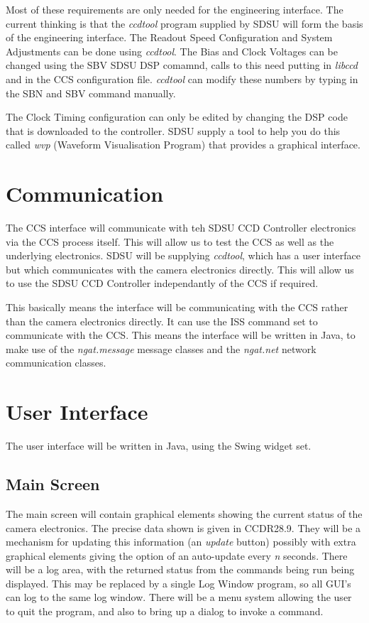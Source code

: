 \documentclass[10pt,a4paper]{article}
\begin{document}
Most of these requirements are only needed for the engineering interface. The current thinking is that the
{\em ccdtool} program supplied by SDSU will form the basis of the engineering interface. The 
Readout Speed Configuration and System Adjustments can be done using {\em ccdtool}. The Bias and Clock Voltages
can be changed using the SBV SDSU DSP comamnd, calls to this need putting in {\em libccd} and in the CCS
configuration file. {\em ccdtool} can modify these numbers by typing in the SBN and SBV command manually.

The Clock Timing configuration can only be edited by changing the DSP code that is downloaded to the
controller. SDSU supply a tool to help you do this called {\em wvp} (Waveform Visualisation Program)
that provides a graphical interface.

\section{Communication}
The CCS interface will communicate with teh SDSU CCD Controller electronics via the CCS process
itself. This will allow us to test the CCS as well as the underlying electronics. SDSU will be supplying
{\em ccdtool}, which has a user interface but which communicates with the camera electronics directly. This will
allow us to use the SDSU CCD Controller independantly of the CCS if required.

This basically means the interface will be communicating with the CCS rather than the camera electronics
directly. It can use the ISS command set to communicate with the CCS. This means the interface will
be written in Java, to make use of the {\em ngat.message} message classes and the {\em ngat.net} network
communication classes.

\section{User Interface}
The user interface will be written in Java, using the Swing widget set.

\subsection{Main Screen}
The main screen will contain graphical elements showing the current status of the camera electronics.
The precise data shown is given in CCDR28.9. They will be a mechanism for updating this information
(an {\em update} button) possibly with extra graphical elements giving the option of an auto-update every
{\em n} seconds. There will be a log area, with the returned status from the commands being run being displayed. 
This may be replaced by a single Log Window program, so all GUI's can log to the same log window.
There will be a menu system allowing the user to quit the program, and also to bring up
a dialog to invoke a command.
\end{document}
